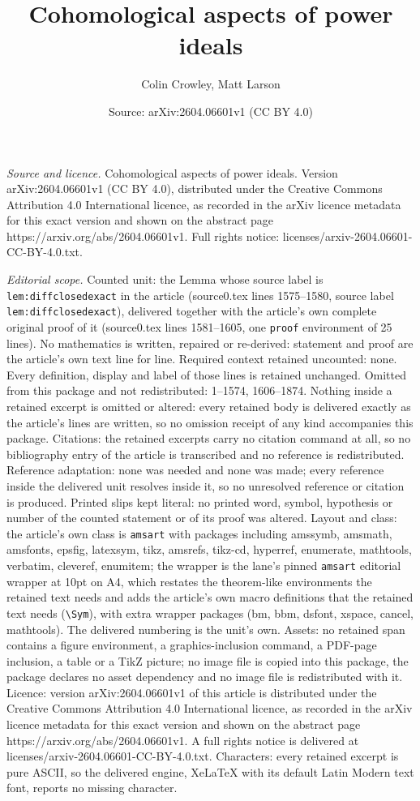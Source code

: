 \documentclass[10pt,a4paper]{amsart}
\title[Cohomological aspects of power ideals]{Cohomological aspects of power ideals}
\author{Colin Crowley, Matt Larson}
\date{Source: arXiv:2604.06601v1 (CC BY 4.0)}
\begin{document}
\maketitle

\noindent\emph{Source and licence.} Cohomological aspects of power ideals. Version arXiv:2604.06601v1 (CC BY 4.0), distributed under the Creative Commons Attribution 4.0 International licence, as recorded in the arXiv licence metadata for this exact version and shown on the abstract page https://arxiv.org/abs/2604.06601v1. Full rights notice: licenses/arxiv-2604.06601-CC-BY-4.0.txt.\par\smallskip

\noindent\textit{Editorial scope.} Counted unit: the Lemma whose source label is \texttt{lem:diffclosedexact} in the article (source0.tex lines 1575--1580, source label \texttt{lem:diffclosedexact}), delivered together with the article's own complete original proof of it (source0.tex lines 1581--1605, one \texttt{proof} environment of 25 lines). No mathematics is written, repaired or re-derived: statement and proof are the article's own text line for line. Required context retained uncounted: none. Every definition, display and label of those lines is retained unchanged. Omitted from this package and not redistributed: 1--1574, 1606--1874. Nothing inside a retained excerpt is omitted or altered: every retained body is delivered exactly as the article's lines are written, so no omission receipt of any kind accompanies this package. Citations: the retained excerpts carry no citation command at all, so no bibliography entry of the article is transcribed and no reference is redistributed. Reference adaptation: none was needed and none was made; every reference inside the delivered unit resolves inside it, so no unresolved reference or citation is produced. Printed slips kept literal: no printed word, symbol, hypothesis or number of the counted statement or of its proof was altered. Layout and class: the article's own class is \texttt{amsart} with packages including amssymb, amsmath, amsfonts, epsfig, latexsym, tikz, amsrefs, tikz-cd, hyperref, enumerate, mathtools, verbatim, cleveref, enumitem; the wrapper is the lane's pinned \texttt{amsart} editorial wrapper at 10pt on A4, which restates the theorem-like environments the retained text needs and adds the article's own macro definitions that the retained text needs (\texttt{\textbackslash Sym}), with extra wrapper packages (bm, bbm, dsfont, xspace, cancel, mathtools). The delivered numbering is the unit's own. Assets: no retained span contains a figure environment, a graphics-inclusion command, a PDF-page inclusion, a table or a TikZ picture; no image file is copied into this package, the package declares no asset dependency and no image file is redistributed with it. Licence: version arXiv:2604.06601v1 of this article is distributed under the Creative Commons Attribution 4.0 International licence, as recorded in the arXiv licence metadata for this exact version and shown on the abstract page https://arxiv.org/abs/2604.06601v1. A full rights notice is delivered at licenses/arxiv-2604.06601-CC-BY-4.0.txt. Characters: every retained excerpt is pure ASCII, so the delivered engine, XeLaTeX with its default Latin Modern text font, reports no missing character.
\end{document}
